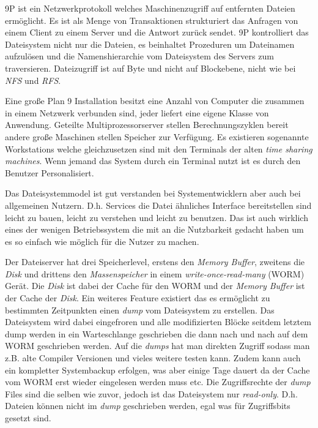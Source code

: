 \documentclass[german, 9pt,technote]{IEEEtran}
\begin{document}
        9P ist ein Netzwerkprotokoll welches Maschinenzugriff auf entfernten Dateien erm\"oglicht.
        Es ist als Menge von Transaktionen strukturiert das Anfragen von einem Client zu einem Server und die Antwort zur\"uck sendet.
        9P kontrolliert das Dateisystem nicht nur die Dateien, es beinhaltet Prozeduren um Dateinamen aufzul\"osen und die Namenshierarchie
        vom Dateisystem des Servers zum traversieren.
        Dateizugriff ist auf Byte und nicht auf Blockebene, nicht wie bei \textit{NFS} und \textit{RFS}.
        
        Eine gro\ss e Plan 9 Installation besitzt eine Anzahl von Computer die zusammen in einem Netzwerk verbunden sind,
        jeder liefert eine eigene Klasse von Anwendung. Geteilte Multiprozessorserver stellen
        Berechnungszyklen bereit andere gro\ss e Maschinen stellen Speicher zur Verf\"ugung. Es existieren sogenannte Workstations welche gleichzusetzen sind mit den 
        Terminals der alten \textit{time sharing machines}. Wenn jemand das System durch ein Terminal nutzt ist es durch den Benutzer Personalisiert.
    
        Das Dateisystemmodel ist gut verstanden bei Systementwicklern aber auch bei allgemeinen Nutzern. 
        D.h. Services die Datei \"ahnliches Interface bereitstellen sind leicht zu bauen, leicht zu verstehen
        und leicht zu benutzen. Das ist auch wirklich eines der wenigen Betriebssystem die mit an die Nutzbarkeit
        gedacht haben um es so einfach wie m\"oglich f\"ur die Nutzer zu machen.
        
        Der Dateiserver hat drei Speicherlevel, erstens den \textit{Memory Buffer}, zweitens die \textit{Disk} und drittens den \textit{Massenspeicher}
        in einem \textit{write-once-read-many} (WORM) Ger\"at. 
        Die \textit{Disk} ist dabei der Cache f\"ur den WORM und der \textit{Memory Buffer} ist der Cache der \textit{Disk}.
        Ein weiteres Feature existiert das es erm\"oglicht zu bestimmten Zeitpunkten einen \textit{dump} vom
        Dateisystem zu erstellen. Das Dateisystem wird dabei eingefroren und alle modifizierten Bl\"ocke seitdem letztem dump werden in ein Warteschlange geschrieben
        die dann nach und nach auf dem WORM geschrieben werden. Auf die \textit{dumps} hat man direkten Zugriff sodass man z.B. alte Compiler Versionen
        und vieles weitere testen kann.
        Zudem kann auch ein kompletter Systembackup erfolgen, was aber einige Tage dauert da der Cache vom WORM erst wieder eingelesen werden muss etc.
        Die Zugriffsrechte der \textit{dump} Files sind die selben wie zuvor, jedoch ist das Dateisystem nur \textit{read-only}.
        D.h. Dateien k\"onnen nicht im \textit{dump} geschrieben werden, egal was f\"ur Zugriffsbits gesetzt sind.
        
\end{document}
